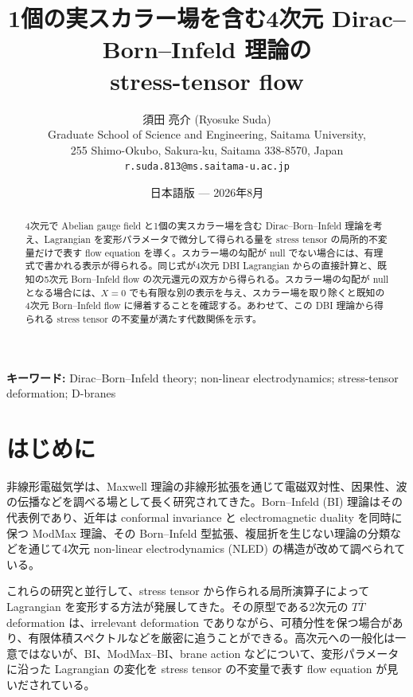 \documentclass[a4paper,11pt]{ltjsarticle}
\title{1個の実スカラー場を含む4次元 Dirac--Born--Infeld 理論の\\stress-tensor flow}
\author{須田 亮介 (Ryosuke Suda)\\[1mm]
\small Graduate School of Science and Engineering, Saitama University,\\
\small 255 Shimo-Okubo, Sakura-ku, Saitama 338-8570, Japan\\
\small \texttt{r.suda.813@ms.saitama-u.ac.jp}}
\date{日本語版 --- 2026年8月}
\numberwithin{equation}{section}
\begin{document}
\maketitle

\begin{abstract}
4次元で Abelian gauge field と1個の実スカラー場を含む Dirac--Born--Infeld 理論を考え、Lagrangian を変形パラメータで微分して得られる量を stress tensor の局所的不変量だけで表す flow equation を導く。スカラー場の勾配が null でない場合には、有理式で書かれる表示が得られる。同じ式が4次元 DBI Lagrangian からの直接計算と、既知の5次元 Born--Infeld flow の次元還元の双方から得られる。スカラー場の勾配が null となる場合には、$X=0$ でも有限な別の表示を与え、スカラー場を取り除くと既知の4次元 Born--Infeld flow に帰着することを確認する。あわせて、この DBI 理論から得られる stress tensor の不変量が満たす代数関係を示す。
\end{abstract}

\noindent\textbf{キーワード:} Dirac--Born--Infeld theory; non-linear electrodynamics; stress-tensor deformation; D-branes

\tableofcontents
\bigskip

\section{はじめに}

非線形電磁気学は、Maxwell 理論の非線形拡張を通じて電磁双対性、因果性、波の伝播などを調べる場として長く研究されてきた。Born--Infeld (BI) 理論はその代表例であり、近年は conformal invariance と electromagnetic duality を同時に保つ ModMax 理論、その Born--Infeld 型拡張、複屈折を生じない理論の分類などを通じて4次元 non-linear electrodynamics (NLED) の構造が改めて調べられている\cite{BornInfeld1934,Bandos2020,Sorokin2021,Ferko2023Birefringence,Ferko2023Duality}。

これらの研究と並行して、stress tensor から作られる局所演算子によって Lagrangian を変形する方法が発展してきた。その原型である2次元の $T\overline T$ deformation は、irrelevant deformation でありながら、可積分性を保つ場合があり、有限体積スペクトルなどを厳密に追うことができる\cite{SmirnovZamolodchikov2016}。高次元への一般化は一意ではないが、BI、ModMax--BI、brane action などについて、変形パラメータに沿った Lagrangian の変化を stress tensor の不変量で表す flow equation が見いだされている\cite{Taylor2018,Babaei2022,Ferko2022,Conti2022,Ferko2023Duality,Brizio2026}。
\end{document}
